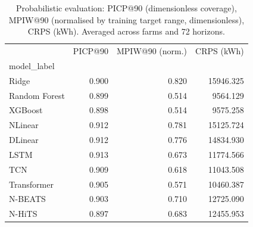 \begin{table}[ht]
\caption{Probabilistic evaluation: PICP@90 (dimensionless coverage), MPIW@90 (normalised by training target range, dimensionless), CRPS (kWh). Averaged across farms and 72 horizons.}
\label{tab:probabilistic}
\begin{tabular}{lrrr}
\toprule
 & PICP@90 & MPIW@90 (norm.) & CRPS (kWh) \\
model_label &  &  &  \\
\midrule
Ridge & 0.900 & 0.820 & 15946.325 \\
Random Forest & 0.899 & 0.514 & 9564.129 \\
XGBoost & 0.898 & 0.514 & 9575.258 \\
NLinear & 0.912 & 0.781 & 15125.724 \\
DLinear & 0.912 & 0.776 & 14834.930 \\
LSTM & 0.913 & 0.673 & 11774.566 \\
TCN & 0.909 & 0.618 & 11043.508 \\
Transformer & 0.905 & 0.571 & 10460.387 \\
N-BEATS & 0.903 & 0.710 & 12725.090 \\
N-HiTS & 0.897 & 0.683 & 12455.953 \\
\bottomrule
\end{tabular}
\end{table}
